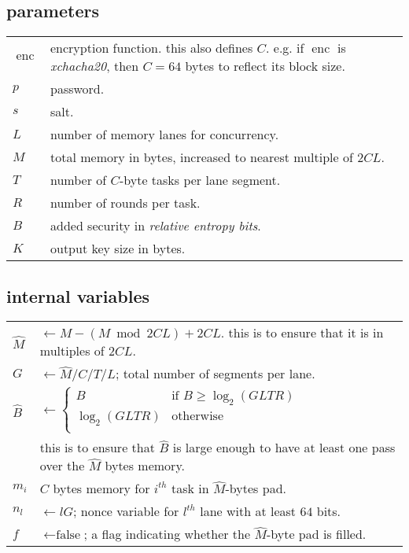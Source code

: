 \documentclass[twocolumn]{article}
\DeclareMathOperator{\enc}{enc}
\begin{document}
\subsection{parameters}
\begin{tabular}{lp{7.5cm}}
    $\enc$ & encryption function.  this also defines $C$.  e.g. if $\enc$
    is \emph{xchacha20}, then $C=64$ bytes to reflect its block size.\\
    $p$ & password.\\
    $s$ & salt.\\
    $L$ & number of memory lanes for concurrency.\\
    $M$ & total memory in bytes, increased to nearest multiple of $2CL$.\\
    $T$ & number of $C$-byte tasks per lane segment.\\
    $R$ & number of rounds per task.\\
    $B$ & added security in \emph{relative entropy bits}.\\
    $K$ & output key size in bytes.\\
\end{tabular}

\subsection{internal variables}
\begin{tabular}{lp{7.5cm}}
    $\hat M$   & $\gets M - (M \bmod 2CL) + 2CL$.  this is to ensure that
    it is in multiples of $2CL$.\\
    $G$   & $\gets \hat M/C/T/L$; total number of segments per lane.\\
    $\hat B$& $\gets \begin{cases}
                    B & \text{if } B \ge \log_2(GLTR)\\
                    \log_2(GLTR) & \text{otherwise}\\
                 \end{cases}$\\
            & this is to ensure that $\hat B$ is large enough to have at
            least one pass over the $\hat M$ bytes memory.\\
    $m_i$ & $C$ bytes memory for $i^{th}$ task in $\hat M$-bytes pad.\\
    $n_l$ & $\gets lG$; nonce variable for $l^{th}$ lane with
    at least $64$ bits.\\
    $f$   & $\gets \text{false}$; a flag indicating whether the $\hat
    M$-byte pad is filled.\\
\end{tabular}
\end{document}
